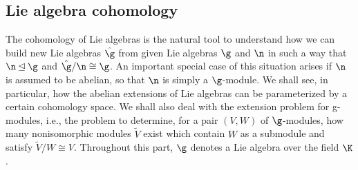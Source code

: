 \subsection{Lie algebra cohomology}
The cohomology of Lie algebras is the natural tool to understand how we can build new Lie algebras $\hat{\g}$ from given Lie algebras $\g$ and $\n$ in such a way that $\n\unlhd\g$ and $\hat{\g}/\n\cong\g$. An important special case of this situation arises if $\n$ is assumed to be abelian, so that $\n$ is simply a $\g$-module. We shall see, in particular, how the abelian extensions of Lie algebras can be parameterized by a certain cohomology space. We shall also deal with the extension problem for g-modules, i.e., the problem to determine, for a pair $(V,W)$ of $\g$-modules, how many nonisomorphic modules $\tilde{V}$ exist which contain $W$ as a submodule and satisfy $\tilde{V}/W\cong V$. Throughout this part, $\g$ denotes a Lie algebra over the field $\K$.
